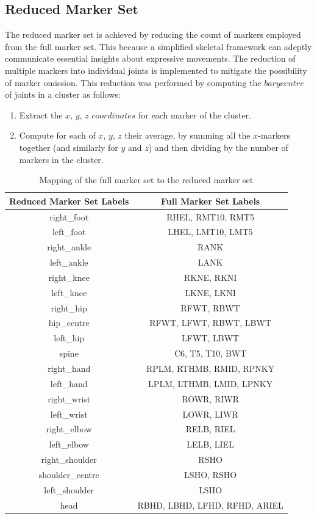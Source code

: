 \subsection{Reduced Marker Set}
The reduced marker set is achieved by reducing the count of markers employed from the full marker set.
This because a simplified skeletal framework can adeptly communicate essential insights about expressive movements.
The reduction of multiple markers into individual joints is implemented to mitigate the possibility of marker omission.
This reduction was performed by computing the $barycentre$ of joints in a cluster as follows:
\begin{enumerate}
    \item Extract the $x$, $y$, $z$ $coordinates$ for each marker of the cluster.
    \item Compute for each of $x$, $y$, $z$ their average, by summing all the $x$-markers together
    (and similarly for $y$ and $z$) and then dividing by the number of markers in the cluster.
\end{enumerate}    

\begin{table}[H]
    \centering
    \begin{tabular}{|c|c|}
        \hline
        \textbf{Reduced Marker Set Labels} & \textbf{Full Marker Set Labels} \\
        \hline
        right\_foot & RHEL, RMT10, RMT5 \\
        left\_foot & LHEL, LMT10, LMT5 \\
        right\_ankle & RANK \\
        left\_ankle & LANK \\
        right\_knee & RKNE, RKNI \\
        left\_knee & LKNE, LKNI \\
        right\_hip & RFWT, RBWT \\
        hip\_centre & RFWT, LFWT, RBWT, LBWT \\
        left\_hip & LFWT, LBWT \\
        spine & C6, T5, T10, BWT \\
        right\_hand & RPLM, RTHMB, RMID, RPNKY\\
        left\_hand & LPLM, LTHMB, LMID, LPNKY \\
        right\_wrist & ROWR, RIWR \\
        left\_wrist & LOWR, LIWR \\
        right\_elbow & RELB, RIEL\\
        left\_elbow & LELB, LIEL \\
        right\_shoulder & RSHO \\
        shoulder\_centre & LSHO, RSHO \\
        left\_shoulder & LSHO \\
        head & RBHD, LBHD, LFHD, RFHD, ARIEL \\
        \hline
    \end{tabular}
    \caption{Mapping of the full marker set to the reduced marker set}
    \label{tab:labels_joints}
\end{table}


